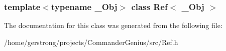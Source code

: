 \subsubsection*{template$<$typename \_\-Obj$>$ class Ref$<$ \_\-Obj $>$}



The documentation for this class was generated from the following file:\begin{DoxyCompactItemize}
\item 
/home/gerstrong/projects/CommanderGenius/src/Ref.h\end{DoxyCompactItemize}
